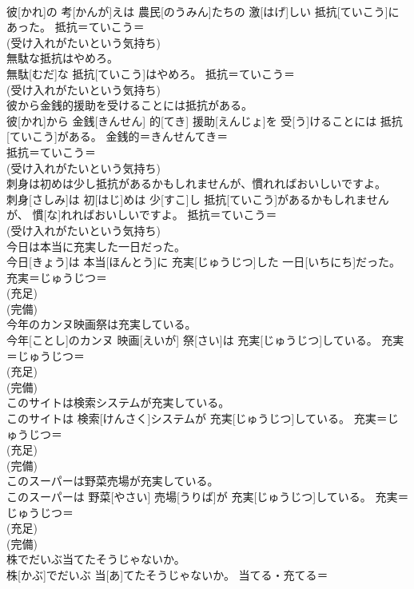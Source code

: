 \documentclass[8pt]{extreport}
\begin{document}
\begin{CJK}{UTF8}{min}
{\\	彼[かれ]の 考[かんが]えは 農民[のうみん]たちの 激[はげ]しい 抵抗[ていこう]にあった。	抵抗＝ていこう＝ 
\\	(受け入れがたいという気持ち)
\\	無駄な抵抗はやめろ。	
\\	無駄[むだ]な 抵抗[ていこう]はやめろ。	抵抗＝ていこう＝ 
\\	(受け入れがたいという気持ち)
\\	彼から金銭的援助を受けることには抵抗がある。	
\\	彼[かれ]から 金銭[きんせん] 的[てき] 援助[えんじょ]を 受[う]けることには 抵抗[ていこう]がある。	金銭的＝きんせんてき＝ 
\\	抵抗＝ていこう＝ 
\\	(受け入れがたいという気持ち)
\\	刺身は初めは少し抵抗があるかもしれませんが、慣れればおいしいですよ。	
\\	刺身[さしみ]は 初[はじ]めは 少[すこ]し 抵抗[ていこう]があるかもしれませんが、 慣[な]れればおいしいですよ。	抵抗＝ていこう＝ 
\\	(受け入れがたいという気持ち)
\\	今日は本当に充実した一日だった。	
\\	今日[きょう]は 本当[ほんとう]に 充実[じゅうじつ]した 一日[いちにち]だった。	充実＝じゅうじつ＝ 
\\	(充足) 
\\	(完備) 
\\	今年のカンヌ映画祭は充実している。	
\\	今年[ことし]のカンヌ 映画[えいが] 祭[さい]は 充実[じゅうじつ]している。	充実＝じゅうじつ＝ 
\\	(充足) 
\\	(完備) 
\\	このサイトは検索システムが充実している。	
\\	このサイトは 検索[けんさく]システムが 充実[じゅうじつ]している。	充実＝じゅうじつ＝ 
\\	(充足) 
\\	(完備) 
\\	このスーパーは野菜売場が充実している。	
\\	このスーパーは 野菜[やさい] 売場[うりば]が 充実[じゅうじつ]している。	充実＝じゅうじつ＝ 
\\	(充足) 
\\	(完備) 
\\	株でだいぶ当てたそうじゃないか。	
\\	株[かぶ]でだいぶ 当[あ]てたそうじゃないか。	当てる・充てる＝ 
}
\end{CJK}
\end{document}
